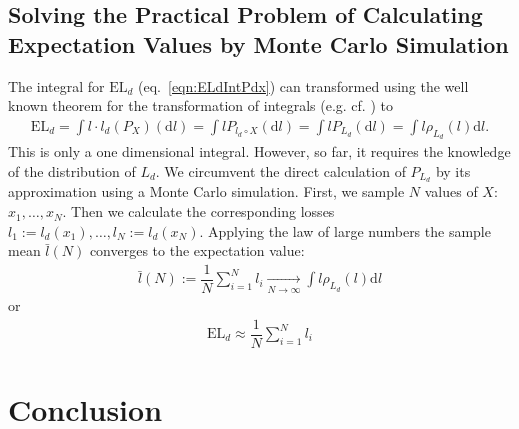 \documentclass[a4paper,10pt,twoside,pagesize,abstracton]{scrartcl}
\renewcommand{\d}{\mathrm{d}\!} %
\newcommand{\EL}{\mathrm{EL}} %
\theoremstyle{plain}%
\theoremstyle{definition}
\theoremstyle{remark}
\begin{document}
\subsection{Solving the Practical Problem of Calculating Expectation Values by Monte Carlo Simulation}
The integral for $\EL_d$ (eq.~\ref{eqn:ELdIntPdx}) can transformed using the well known theorem for the transformation of integrals (e.g. cf. \citet{Bauer1992}) to
\begin{align}
  \EL_d =  \int l \cdot l_d(P_X) (\d l) = \int l P_{l_d \circ X} (\d l) = \int l P_{L_d } (\d l) = \int l \rho_{L_d }(l) \d l.
\end{align}
This is only a one dimensional integral. However, so far, it requires the knowledge of the distribution of $L_d$. We circumvent the direct calculation of $P_{L_d }$ by its approximation using  a Monte Carlo simulation. First, we sample $N$ values of $X$: $x_1, \ldots, x_N$. Then we calculate the corresponding losses $l_1 := l_d(x_1), \ldots, l_N := l_d(x_N)$. Applying the law of large numbers the sample mean $\bar{l}(N)$ converges to the expectation value:
\begin{align}
  \bar{l}(N) := \dfrac{1}{N} \sum_{i=1}^N l_i \xrightarrow[N \rightarrow \infty]{ } \int l \rho_{L_d }(l) \d l
\end{align}
or
\begin{align}
   \EL_d \approx \dfrac{1}{N} \sum_{i=1}^N l_i
\end{align}

\section{Conclusion}



\end{document}
